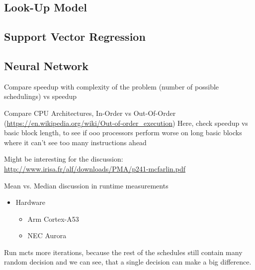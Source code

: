 \subsection{Look-Up Model}
\subsection{Support Vector Regression}
\subsection{Neural Network}

Compare speedup with complexity of the problem (number of possible schedulings) vs speedup

Compare CPU Architectures, In-Order vs Out-Of-Order (\url{https://en.wikipedia.org/wiki/Out-of-order_execution})
Here, check speedup vs basic block length, to see if ooo processors perform worse on long basic blocks where it can't see too many instructions ahead

Might be interesting for the discussion: \url{http://www.irisa.fr/alf/downloads/PMA/p241-mcfarlin.pdf}

Mean vs. Median discussion in runtime measurements

\begin{itemize}
    \item Hardware
    \begin{itemize}
        \item Arm Cortex-A53
        \item NEC Aurora
    \end{itemize}
\end{itemize}



Run \ac{mcts} more iterations, because the rest of the schedules still contain many random decision and we can see, that a single decision can make a big difference.
